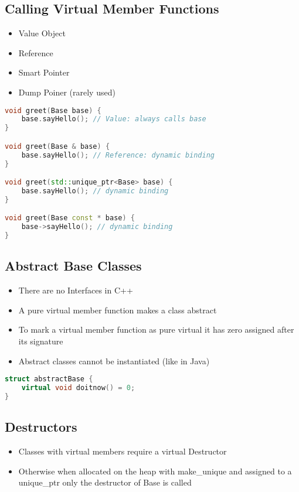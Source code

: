 \subsection{Calling Virtual Member Functions}
\begin{itemize}
  \itemsep -0.5em 
  \item Value Object
  \item	Reference
  \item Smart Pointer
  \item Dump Poiner (rarely used)
\end{itemize}

\begin{lstlisting}[language=C++]
void greet(Base base) {
	base.sayHello(); // Value: always calls base
}

void greet(Base & base) {
	base.sayHello(); // Reference: dynamic binding
}

void greet(std::unique_ptr<Base> base) {
	base.sayHello(); // dynamic binding
}

void greet(Base const * base) {
	base->sayHello(); // dynamic binding
}
\end{lstlisting}

\subsection{Abstract Base Classes}
\begin{itemize}
  \itemsep -0.5em 
  \item There are no Interfaces in C++
  \item A pure virtual member function makes a class abstract
  \item To mark a virtual member function as pure virtual it has zero assigned after its signature
  \item Abstract classes cannot be instantiated (like in Java)
\end{itemize}

\begin{lstlisting}[language=C++]
struct abstractBase {
	virtual void doitnow() = 0;
}
\end{lstlisting}

\subsection{Destructors}
\begin{itemize}
  \itemsep -0.5em 
  \item Classes with virtual members require a virtual Destructor
  \item Otherwise when allocated on the heap with make\_unique and assigned to a unique\_ptr only the destructor of Base is called
\end{itemize}

